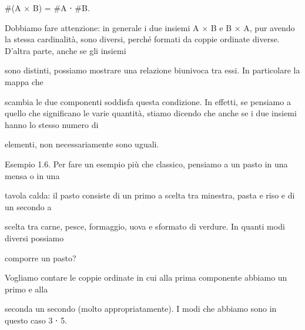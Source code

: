 \documentclass[a4paper,portrait,12pt]{article}
\begin{document}
\begin{flushleft}
\#(A × B) = \#A ⋅ \#B.
\end{flushleft}


\begin{flushleft}
Dobbiamo fare attenzione: in generale i due insiemi A × B e B × A, pur avendo la stessa cardinalit\`{a}, sono diversi, perch\'{e} formati da coppie ordinate diverse. D'altra parte, anche se gli insiemi
\end{flushleft}


\begin{flushleft}
sono distinti, possiamo mostrare una relazione biunivoca tra essi. In particolare la mappa che
\end{flushleft}


\begin{flushleft}
scambia le due componenti soddisfa questa condizione. In effetti, se pensiamo a quello che significano le varie quantit\`{a}, stiamo dicendo che anche se i due insiemi hanno lo stesso numero di
\end{flushleft}


\begin{flushleft}
elementi, non necessariamente sono uguali.
\end{flushleft}


\begin{flushleft}
Esempio 1.6. Per fare un esempio più che classico, pensiamo a un pasto in una mensa o in una
\end{flushleft}


\begin{flushleft}
tavola calda: il pasto consiste di un primo a scelta tra minestra, pasta e riso e di un secondo a
\end{flushleft}


\begin{flushleft}
scelta tra carne, pesce, formaggio, uova e sformato di verdure. In quanti modi diversi possiamo
\end{flushleft}


\begin{flushleft}
comporre un pasto?
\end{flushleft}


\begin{flushleft}
Vogliamo contare le coppie ordinate in cui alla prima componente abbiamo un primo e alla
\end{flushleft}


\begin{flushleft}
seconda un secondo (molto appropriatamente). I modi che abbiamo sono in questo caso 3 ⋅ 5.
\end{flushleft}
\end{document}
